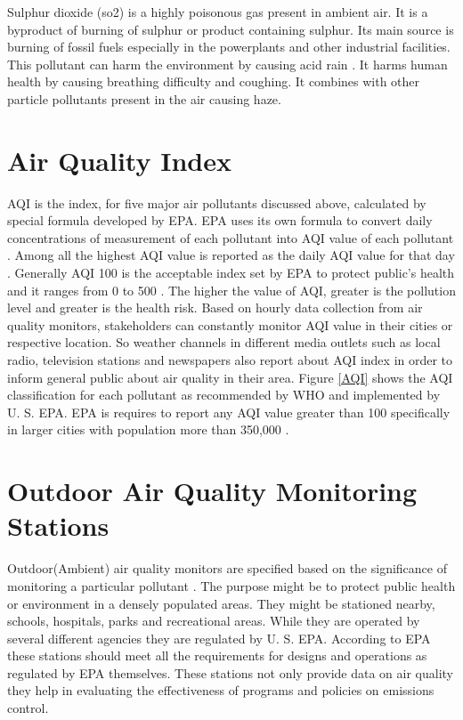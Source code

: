 \documentclass[sigconf]{acmart}
\begin{document}
Sulphur dioxide (so2) is a highly poisonous gas present in ambient air. It is a byproduct of burning of sulphur or product containing sulphur. Its main source is burning of fossil fuels especially in the powerplants and other industrial facilities. This pollutant can harm the environment by causing acid rain \cite{sulphur}. It harms human health by causing breathing difficulty and coughing. It combines with other particle pollutants present in the air causing haze. 

\section{Air Quality Index}
   AQI is the index, for five major air pollutants discussed above, calculated by special formula developed by EPA. EPA uses its own formula to convert daily concentrations of measurement of each pollutant into AQI value of each pollutant \cite{airnow-gov}. Among all the highest AQI value is reported as the daily AQI value for that day \cite{airnow-gov}.  Generally AQI 100 is the acceptable index set by EPA to protect public's health and it ranges from 0 to 500 \cite{airnow-gov}. The higher the value of AQI, greater is the pollution level and greater is the health risk. Based on hourly data collection from air quality monitors, stakeholders can constantly monitor AQI value in their cities or respective location. So weather channels in different media outlets such as local radio, television stations and newspapers also report about AQI index in order to inform general public about air quality in their area. Figure \ref{AQI} shows the AQI classification for each pollutant as recommended by WHO and implemented by U. S. EPA. EPA is requires to report any AQI value greater than 100 specifically in larger cities with population more than 350,000 \cite{airnow-gov}.


\section{Outdoor Air Quality Monitoring Stations}
   Outdoor(Ambient) air quality monitors are specified based on the significance of monitoring a particular pollutant \cite{air-quality}. The purpose might be to protect public health or environment in a densely populated areas. They might be stationed nearby, schools, hospitals, parks and recreational areas. While they are operated by several different agencies they are regulated by U. S. EPA. According to EPA these stations should meet all the requirements for designs and operations as regulated by EPA themselves. These stations not only provide data on air quality they help in evaluating the effectiveness of programs and policies on emissions control.
\end{document}
